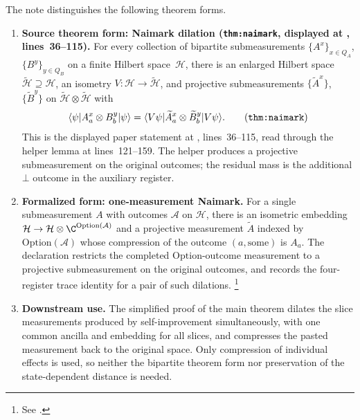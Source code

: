 \documentclass[11pt]{article}
\begin{document}
The note distinguishes the following theorem forms.
\begin{enumerate}
  \item \textbf{Source theorem form: Naimark dilation
  (\texttt{thm:naimark}, displayed at
  , lines~36--115).}
  For every collection of bipartite
  submeasurements $\{A^x\}_{x\in Q_A}$, $\{B^y\}_{y\in Q_B}$ on a finite
  Hilbert space~$\mathcal H$, there is an enlarged Hilbert space $\widetilde
  {\mathcal H}\supseteq\mathcal H$, an isometry $V:\mathcal H\to\widetilde
  {\mathcal H}$, and projective submeasurements $\{\widetilde A^x\}$,
  $\{\widetilde B^y\}$ on $\widetilde{\mathcal H}\otimes\widetilde{\mathcal H}$
  with
  \[
    \langle\psi|A^x_a\otimes B^y_b|\psi\rangle
    =\langle V\psi|\widetilde A^x_a\otimes \widetilde B^y_b|V\psi\rangle.
    \tag{\texttt{thm:naimark}}
  \]
  This is the displayed paper statement at
  , lines~36--115, read
  through the helper lemma at lines~121--159.  The helper produces a
  projective submeasurement on the original outcomes; the residual mass is the
  additional $\bot$ outcome in the auxiliary register.
  \item \textbf{Formalized form: one-measurement Naimark.}  For a single
  submeasurement $A$ with outcomes $\mathcal A$ on $\mathcal H$, there is an
  isometric embedding $\mathcal H\to\mathcal H\otimes\C^{\mathrm{Option}(\mathcal A)}$
  and a projective measurement $\widetilde A$ indexed by
  $\mathrm{Option}(\mathcal A)$ whose compression of the outcome
  $(a,\mathrm{some})$ is $A_a$.  The declaration
   restricts the completed
  $\mathrm{Option}$-outcome measurement to a projective submeasurement on the
  original outcomes, and
   records the
  four-register trace identity for a pair of such dilations.%
  \footnote{See
  .}
  \item \textbf{Downstream use.}  The simplified proof of the main theorem
  dilates the slice measurements produced by self-improvement simultaneously,
  with one common ancilla and embedding for all slices, and compresses the
  pasted measurement back to the original space.  Only compression of
  individual effects is used, so neither the bipartite theorem form nor
  preservation of the state-dependent distance is needed.
\end{enumerate}
\end{document}
